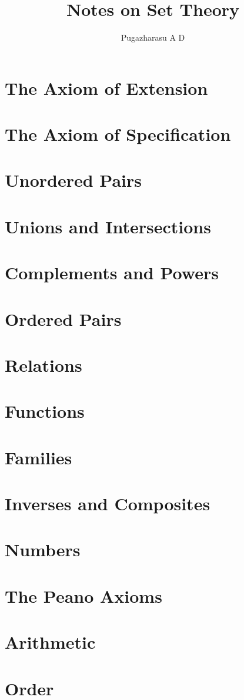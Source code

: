 \documentclass[a4paper,12pt]{article}
\begin{document}
\author{Pugazharasu A D}
\title{Notes on Set Theory}

\section{The Axiom of Extension}
\section{The Axiom of Specification}
\section{Unordered Pairs}
\section{Unions and Intersections}
\section{Complements and Powers}
\section{Ordered Pairs}
\section{Relations}
\section{Functions}
\section{Families}
\section{Inverses and Composites}
\section{Numbers}
\section{The Peano Axioms}
\section{Arithmetic}
\section{Order}
\end{document}
